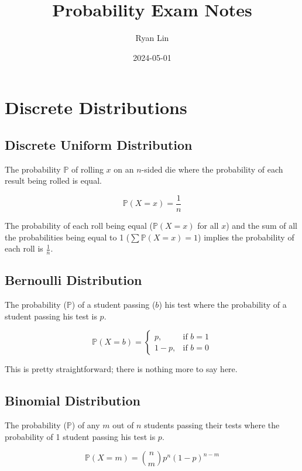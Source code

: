 \documentclass{article}
\title{Probability Exam Notes}
\author{Ryan Lin}
\date{2024-05-01}
\begin{document}
	\maketitle

	\section{Discrete Distributions}

	\subsection{Discrete Uniform Distribution}
	The probability $\mathbb{P}$ of rolling $x$ on an $n$-sided die where the probability of each result being rolled is equal.

	\[
		\mathbb{P}(X=x)=\frac{1}{n}
	\]

	The probability of each roll being equal ($\mathbb{P}(X=x)$ for all $x$) and the sum of all the probabilities being equal to 1 ($\sum\mathbb{P}(X=x)=1$) implies the probability of each roll is $\frac{1}{n}$.

	\subsection{Bernoulli Distribution}
	The probability ($\mathbb{P}$) of a student passing ($b$) his test where the probability of a student passing his test is $p$.

	\[
		\mathbb{P}(X=b)=\begin{cases}
					p, & \text{if } b=1 \\
					1-p, & \text{if } b=0
		\end{cases}
	\]

	This is pretty straightforward; there is nothing more to say here.

	\subsection{Binomial Distribution}
	The probability ($\mathbb{P}$) of any $m$ out of $n$ students passing their tests where the probability of 1 student passing his test is $p$.

	\[
		\mathbb{P}(X=m)=\binom{n}{m}p^n(1-p)^{n-m}
	\]
\end{document}
